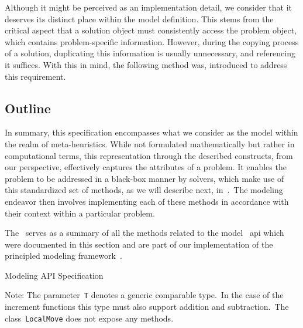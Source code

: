 Although it might be perceived as an implementation detail, we consider that it
deserves its distinct place within the model definition. This stems from the
critical aspect that a solution object must consistently access the problem
object, which contains problem-specific information. However, during the copying
process of a solution, duplicating this information is usually unnecessary, and
referencing it suffices. With this in mind, the following method was, introduced
to address this requirement.

\begin{center}
\end{center}

\subsection{Outline}

In summary, this specification encompasses what we consider as the model within
the realm of meta-heuristics. While not formulated mathematically but rather in
computational terms, this representation through the described constructs, from
our perspective, effectively captures the attributes of a problem. It enables
the problem to be addressed in a black-box manner by solvers, which make use of
this standardized set of methods, as we will describe next,
in~.~The modeling endeavor then involves implementing each of
these methods in accordance with their context within a particular problem.

The~ serves as a summary of all the methods related to the model
~\acrshort{api} which were documented in this section and are part of our
implementation of the principled modeling framework~\cite{rodriguesnasf4niopy}.

\begin{table}[h]
  \centering
  
  \caption{Modeling API Specification}
  \caption*{\small Note: The parameter~\texttt{T} denotes a generic comparable
    type.~In the case of the increment functions this type must also support
    addition and subtraction.~The class~\texttt{LocalMove} does not expose any methods.
  }
  \label{tab:api}
\end{table}
